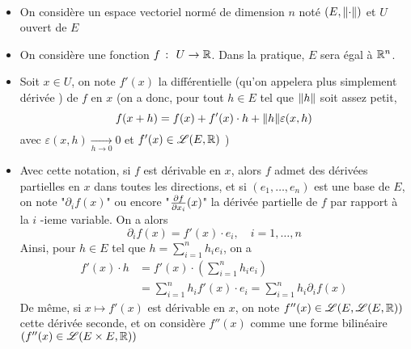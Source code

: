 \begin{notation}\,
    \begin{itemize}
        \item On considère un espace vectoriel normé de dimension \(n\)
        noté \((E, \mathopen{}\left\|\cdot\right\|\mathclose{})\) et \(U\) ouvert de \(E\)
    
        \item On considère une fonction \(f\ \colon\ U\to\R\). Dans la pratique,
        \(E\) sera égal à \(\mathbb{R}^n\).
    
        \item Soit \(x\in U\), on note \(f'(x)\) la différentielle
        (qu'on appelera plus simplement \og{} dérivée \fg{}) %
        de \(f\) en \(x\) (on a donc, pour tout \(h\in E\) tel que
        \(\mathopen{}\left\|h\right\|\mathclose{}\) soit assez petit, 
        \begin{equation*}
            f(x+h) = f(x) + f'(x)\cdot h + \mathopen{}\left\|h\right\|\mathclose{} \varepsilon(x,h)
        \end{equation*}
        avec \(\varepsilon(x,h) \underset{h\to 0}{\to} 0\)
        et \(f'(x)\in \mathscr{L}(E, \mathbb{R})\) ) %
    
        \item Avec cette notation, si \(f\) est dérivable en \(x\),
        alors \(f\) admet des dérivées partielles en \(x\) dans toutes les
        directions, et si \((e_1,\ldots,e_n)\) est une base de \(E\),
        on note "\(\partial_i f(x)\)" ou encore "\(\frac{\partial{f}}{\partial{x_i}}(x)\)"
        la dérivée partielle de \(f\) par rapport à la \(i\) -ieme variable.
        On a alors
        \begin{equation*}
            \partial_i f(x) = f'(x)\cdot e_i,\quad i=1,\ldots,n
        \end{equation*}
        Ainsi, pour \(h\in E\) tel que \(h=\sum_{i=1}^n h_i e_i\), 
        on a
        \begin{equation*}
            \begin{aligned}
                f'(x)\cdot h &= f'(x) \cdot \left(\sum_{i=1}^n h_i e_i\right)\\
                &= \sum_{i=1}^n h_i f'(x)\cdot e_i = \sum_{i=1}^n h_i\partial_i f(x)
            \end{aligned}
        \end{equation*}
        De même, si \(x\mapsto f'(x)\) est dérivable en \(x\), on note
        \(f''(x)\in\mathscr{L}(E, \mathscr{L}(E,\mathbb{R}))\) cette dérivée seconde, et on
        considère \(f''(x)\) comme une forme bilinéaire \((f''(x)\in\mathscr{L}(E\times E, \mathbb{R}))\)
    

\end{itemize}
\end{notation}
